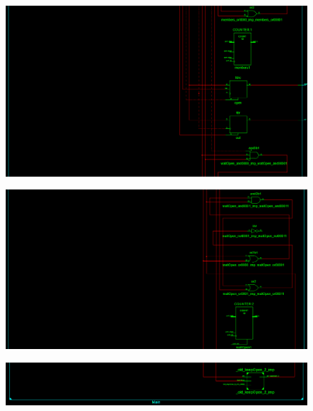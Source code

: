 \documentclass[fleqn]{article}
\begin{document}
\begin{figure}[H]
	\centering
	\includegraphics[width=.5\paperwidth]{./Schematic/3.png}
\end{figure}
\begin{figure}[H]
	\centering
	\includegraphics[width=.5\paperwidth]{./Schematic/4.png}
\end{figure}
\begin{figure}[H]
	\centering
	\includegraphics[width=.5\paperwidth]{./Schematic/5.png}
\end{figure}
\end{document}
